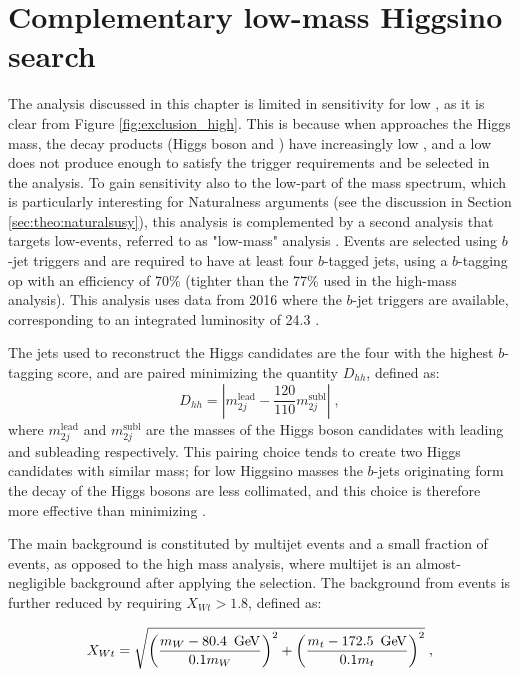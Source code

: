 \section{Complementary low-mass Higgsino search}
\label{sec:ewk:LM}

The analysis discussed in this chapter is limited in sensitivity for low \mhino, as it is clear from Figure \ref{fig:exclusion_high}. 
This is because when \mhino approaches the Higgs mass, the decay products (Higgs boson and \gravino)
have increasingly low \pt, and a low \pt \gravino does not produce enough \met to satisfy the \met trigger requirements and be selected 
in the analysis. 
To gain sensitivity also to the low-\mhino part of the mass spectrum, which is particularly interesting for Naturalness arguments (see the 
discussion in Section \ref{sec:theo:naturalsusy}), 
this analysis is complemented by a second analysis that targets low-\met events, referred to as "low-mass" analysis \cite{Aaboud:2018htj}. 
Events are selected using $b$-jet triggers and are required to have at least four $b$-tagged jets, 
using a $b$-tagging \gls{op} with an efficiency of 70\%
(tighter than the 77\% used in the high-mass analysis).
This analysis uses data from 2016 where the $b$-jet triggers are available, corresponding to an integrated luminosity of 24.3 \ifb.

The jets used to reconstruct the Higgs candidates are the four with the highest $b$-tagging score, and are paired minimizing the quantity 
$D_{hh}$, defined as:
\begin{equation}
  D_{hh} = \left|m_{2j}^\textrm{lead} - \frac{120}{110}m_{2j}^\textrm{subl}\right| \; ,
\end{equation}
where $m_{2j}^\textrm{lead}$ and $m_{2j}^\textrm{subl}$ are the masses of the Higgs boson candidates with leading and subleading \pt respectively.
This pairing choice tends to create two Higgs candidates with similar mass; 
for low Higgsino masses the $b$-jets originating form the decay of the Higgs bosons are less collimated, 
and this choice is therefore more effective than minimizing \dRmax. 

The main background is constituted by multijet events and a small fraction of \ttbar events, as opposed to the
high mass analysis, where multijet is an almost-negligible background after applying the \dphimin selection. 
The background from \ttbar events is further reduced by requiring $X_{Wt}>1.8$, defined as:

\begin{equation}
 X_{Wt} = \sqrt{\left( \frac{m_W - 80.4\,\ \gev}{0.1  m_W} \right)^2 + \left( \frac{m_t - 172.5\,\ \gev}{0.1  m_t} \right)^2 } \;,
\label{eqn:xwt}
\end{equation}

